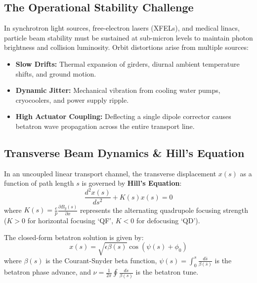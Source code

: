 \documentclass[11pt,a4paper]{article}
\begin{document}
\subsection{The Operational Stability Challenge}
In synchrotron light sources, free-electron lasers (XFELs), and medical linacs, particle beam stability must be sustained at sub-micron levels to maintain photon brightness and collision luminosity. 
Orbit distortions arise from multiple sources:
\begin{itemize}
    \item \textbf{Slow Drifts:} Thermal expansion of girders, diurnal ambient temperature shifts, and ground motion.
    \item \textbf{Dynamic Jitter:} Mechanical vibration from cooling water pumps, cryocoolers, and power supply ripple.
    \item \textbf{High Actuator Coupling:} Deflecting a single dipole corrector causes betatron wave propagation across the entire transport line.
\end{itemize}

\subsection{Transverse Beam Dynamics \& Hill's Equation}
In an uncoupled linear transport channel, the transverse displacement $x(s)$ as a function of path length $s$ is governed by \textbf{Hill's Equation}:
\begin{equation}
    \frac{d^2 x(s)}{ds^2} + K(s) x(s) = 0
\end{equation}
where $K(s) = \frac{e}{p} \frac{\partial B_y(s)}{\partial x}$ represents the alternating quadrupole focusing strength ($K > 0$ for horizontal focusing `QF', $K < 0$ for defocusing `QD').

The closed-form betatron solution is given by:
\begin{equation}
    x(s) = \sqrt{\epsilon \beta(s)} \cos\left( \psi(s) + \phi_0 \right)
\end{equation}
where $\beta(s)$ is the Courant-Snyder beta function, $\psi(s) = \int_0^s \frac{d\bar{s}}{\beta(\bar{s})}$ is the betatron phase advance, and $\nu = \frac{1}{2\pi} \oint \frac{ds}{\beta(s)}$ is the betatron tune.
\end{document}
